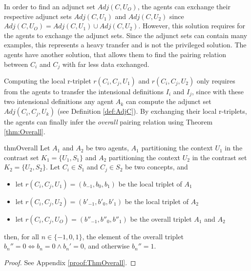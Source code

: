 In order to find an adjunct set $Adj(C, U_{O})$, the agents can exchange their respective adjunct sets $Adj(C, U_{1})$ and $Adj(C, U_{2})$ since $Adj(C, U_{O}) = Adj(C, U_{1}) \cup Adj(C, U_{2})$. However, this solution requires for the agents to exchange the adjunct sets. Since the adjunct sets can contain many examples, this represents a heavy transfer and is not the privileged solution. The agents have another solution, that allows them to find the pairing relation between $C_{i}$ and $C_{j}$ with far less data exchanged.

Computing the local r-triplet $r(C_{i}, C_{j}, U_{1})$ and $r(C_{i}, C_{j}, U_{2})$ only requires from the agents to transfer the intensional definitions $I_{i}$ and $I_{j}$, since with these two intensional definitions any agent $A_{k}$ can compute the adjunct set $Adj(C_{i}, C_{j}, U_{k})$ (see Definition \ref{def:AdjC}). By exchanging their local r-triplets, the agents can finally infer the \emph{overall} pairing relation using Theorem \ref{thm:Overall}.
 
\begin{restatable}{thm}{Overall}\label{thm:Overall}
Let $A_{1}$ and $A_{2}$ be two  agents, $A_{1}$ partitioning the context $U_{1}$ in the contrast set $K_{1} = \{ U_{1}, S_{1} \}$ and $A_{2}$ partitioning the context $U_{2}$ in the contrast set $K_{2} = \{ U_{2}, S_{2}\}$. Let $C_{i} \in S_{1}$ and $C_{j} \in S_{2}$ be two concepts, and
\begin{itemize}
\item let $r(C_{i},C_{j},U_{1}) = (b_{-1}, b_{0}, b_{1})$ be the local triplet of $A_{1}$
\item let $r(C_{i},C_{j},U_{2}) = (b'_{-1}, b'_{0}, b'_{1})$ be the local triplet of $A_{2}$
\item  let $r(C_{i}, C_{j}, U_{O}) = (b''_{-1}, b''_{0}, b''_{1})$ be the overall triplet $A_{1}$ and $A_{2}$
\end{itemize}
then, for all $n \in \{-1, 0, 1\}$, the element of the overall triplet $b_{n}''=0 \Leftrightarrow b_{n} = 0 \wedge b_{n}' = 0$, and otherwise $b_{n}''=1$.
\end{restatable}

\begin{proof}
See Appendix \ref{proof:ThmOverall}.
\end{proof}

